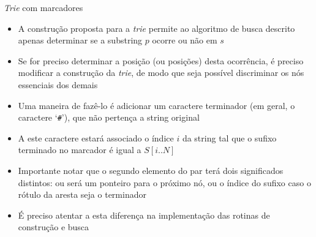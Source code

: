 \begin{frame}[fragile]{{\it Trie} com marcadores}

    \begin{itemize}
        \item A construção proposta para a \textit{trie} permite ao algoritmo de busca descrito 
            apenas determinar se a substring $p$ ocorre ou não em $s$

        \item Se for preciso determinar a posição (ou posições) desta ocorrência, é preciso 
            modificar a construção da \textit{trie}, de modo que seja possível discriminar os nós 
                essenciais dos demais

        \item Uma maneira de fazê-lo é adicionar um caractere terminador (em geral, o caractere
            `\texttt{\#}'), que não pertença a string original

        \item A este caractere estará associado o índice $i$ da string tal que o sufixo terminado 
            no marcador é igual a $S[i..N]$

        \item Importante notar que o segundo elemento do par terá dois significados distintos: ou
            será um ponteiro para o próximo nó, ou o índice do sufixo caso o rótulo da aresta
            seja o terminador

        \item É preciso atentar a esta diferença na implementação das rotinas de construção e
            busca
    \end{itemize}

\end{frame}

